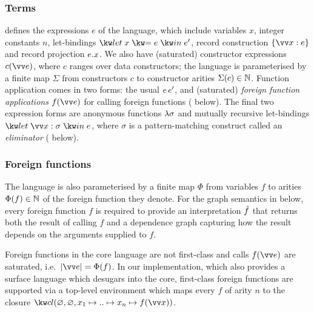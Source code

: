 \subsubsection{Terms}
\label{sec:core:expressions}

 defines the expressions $e$ of the language, which include variables $x$, integer constants
$n$, let-bindings $\exLet{x}{e}{e'}$, record construction $\exRec{\seq{\bind{x}{e}}}$ and record projection
$e.x$. We also have (saturated) constructor expressions $\exConstr{c}{\seq{e}}$, where $c$ ranges
over data constructors; the language is parameterised by a finite map $\Sigma$ from constructors $c$ to
constructor arities $\Sigma(c) \in \mathbb{N}$. Function application comes in two forms: the usual
${e}\,{e'}$, and (saturated) \emph{foreign function applications} $\exForeignApp{f}{\seq{e}}$ for calling
foreign functions ( below). The final two expression forms are anonymous functions
$\lambda{\sigma}$ and mutually recursive let-bindings $\exLetRecElim{\seq{x : \sigma}}{e}$, where $\sigma$ is a
pattern-matching construct called an \emph{eliminator} ( below).

\subsubsection{Foreign functions}
\label{sec:core:foreign}
The language is also parameterised by a finite map $\Phi$ from variables $f$ to arities $\Phi(f) \in \mathbb{N}$ of
the foreign function they denote. For the graph semantics in  below, every foreign
function $f$ is required to provide an interpretation $\hat{f}$ that returns both the result of calling
$f$ and a dependence graph capturing how the result depends on the arguments supplied to $f$.

Foreign functions in the core language are not first-class and calls $\exForeignApp{f}{\seq{e}}$ are
saturated, i.e.~$\length{\seq{e}} = \Phi{(f)}$. In our implementation, which also provides a surface language
which desugars into the core, first-class foreign functions are supported via a top-level environment which
maps every ${f}$ of arity $n$ to the closure
$\exClosure{\envEmpty}{\envEmpty}{\elimVar{x_1}{\elimVar{\iter}{\elimVar{x_{n}}{\exForeignApp{f}{\seq{x}}}}}}$.

